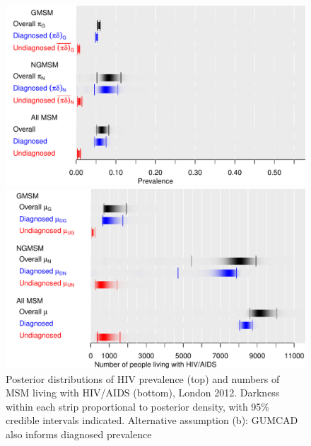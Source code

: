 \documentclass[12pt]{article}\usepackage[]{graphicx}\usepackage[]{color}
\makeatletter
\def\maxwidth{ %
  \ifdim\Gin@nat@width>\linewidth
    \linewidth
  \else
    \Gin@nat@width
  \fi
}
\newenvironment{knitrout}{}{} %
\makeatother
\begin{document}
\begin{figure}
\begin{knitrout}
\color{fgcolor}
\includegraphics[width=\maxwidth]{figure/prevnums-gudnd-1} 

\includegraphics[width=\maxwidth]{figure/prevnums-gudnd-2} 

\end{knitrout}
  \caption{Posterior distributions of HIV prevalence (top) and numbers of MSM living with HIV/AIDS (bottom), London 2012. Darkness within each strip proportional to posterior density, with 95\% credible intervals indicated. Alternative assumption (b): GUMCAD also informs diagnosed prevalence }
  \label{fig:res:prev}
\end{figure}




\end{document}
